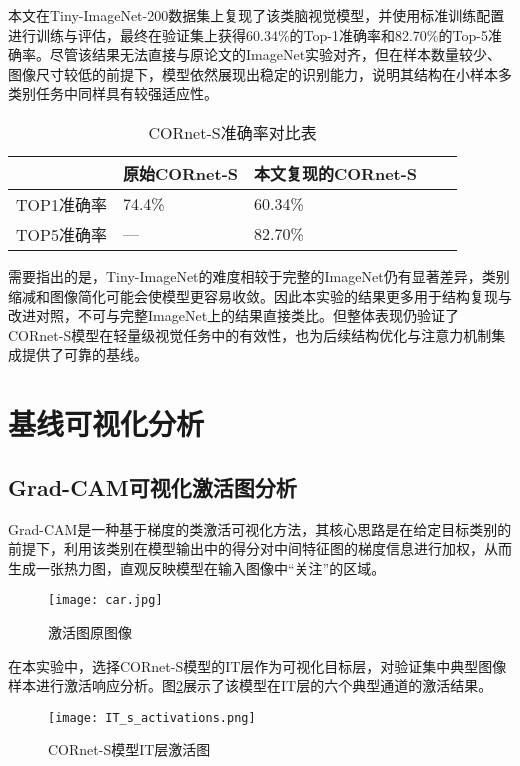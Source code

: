 本文在Tiny-ImageNet-200数据集上复现了该类脑视觉模型，并使用标准训练配置进行训练与评估，最终在验证集上获得60.34\%的Top-1准确率和82.70\%的Top-5准确率。尽管该结果无法直接与原论文的ImageNet实验对齐，但在样本数量较少、图像尺寸较低的前提下，模型依然展现出稳定的识别能力，说明其结构在小样本多类别任务中同样具有较强适应性。

\begin{table}[htb]
	\centering
	\caption{CORnet-S准确率对比表}
	\label{tab:CORnet-S}
	\begin{tabular}{lllll}
		\hline
		       & 原始CORnet-S & 本文复现的CORnet-S \\
		\hline
		TOP1准确率 & 74.4\% & 60.34\%   \\
		TOP5准确率 & — & 82.70\%    \\
		\hline
	\end{tabular}
\end{table}

需要指出的是，Tiny-ImageNet的难度相较于完整的ImageNet仍有显著差异，类别缩减和图像简化可能会使模型更容易收敛。因此本实验的结果更多用于结构复现与改进对照，不可与完整ImageNet上的结果直接类比。但整体表现仍验证了CORnet-S模型在轻量级视觉任务中的有效性，也为后续结构优化与注意力机制集成提供了可靠的基线。

\section{基线可视化分析}

\subsection{Grad-CAM可视化激活图分析}

Grad-CAM是一种基于梯度的类激活可视化方法，其核心思路是在给定目标类别的前提下，利用该类别在模型输出中的得分对中间特征图的梯度信息进行加权，从而生成一张热力图，直观反映模型在输入图像中“关注”的区域\cite{selvaraju2016grad}。

\begin{figure}[hbt]
	\centering
	\texttt{[image: car.jpg]}
	\caption{激活图原图像}
	\label{f.car}
\end{figure}


在本实验中，选择CORnet-S模型的IT层作为可视化目标层，对验证集中典型图像样本进行激活响应分析。图\ref{f.it_s_act}展示了该模型在IT层的六个典型通道的激活结果。

\begin{figure}[hbt]
	\centering
	\texttt{[image: IT\_s\_activations.png]}
	\caption{CORnet-S模型IT层激活图}
	\label{f.it_s_act}
\end{figure}

